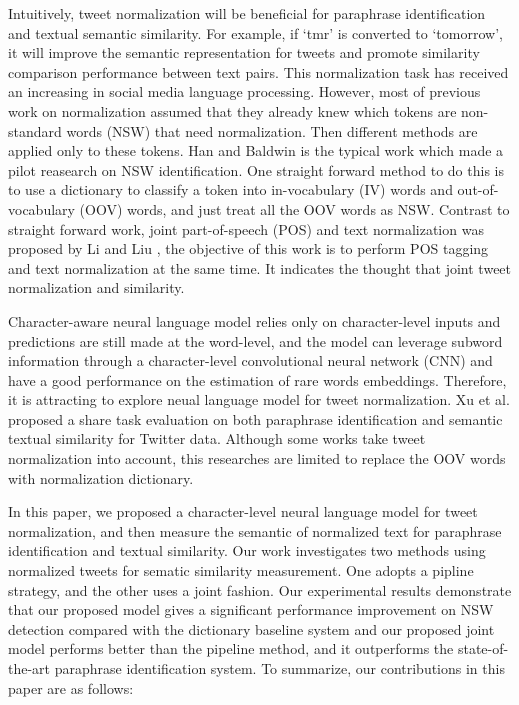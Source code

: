 \documentclass[letterpaper]{article}
\begin{document}
Intuitively, tweet normalization will be beneficial for paraphrase identification and textual  semantic similarity. For example, if `tmr' is converted to `tomorrow', it will improve the semantic representation for tweets and promote similarity comparison performance between text pairs. This normalization task has received an increasing in social media language processing. However, most of previous work on normalization assumed that they already knew which tokens are non-standard words (NSW) that need normalization. Then different methods are applied only to these tokens. Han and Baldwin  is the typical work which made a pilot reasearch on NSW identification. One straight forward method to do this is to use a dictionary to classify a token into in-vocabulary (IV) words and out-of-vocabulary (OOV) words, and just treat all the OOV words as NSW. Contrast to straight forward work, joint part-of-speech (POS) and text normalization was proposed by Li and Liu , the objective of this work is to perform POS tagging and text normalization at the same time. It indicates the thought that joint tweet normalization and similarity.

Character-aware neural language model \cite{Kim-AAAI1612489} relies only on character-level inputs and predictions are still made at the word-level, and the model can leverage subword information through a character-level convolutional neural network (CNN) and have a good performance on the estimation of rare words embeddings. Therefore, it is attracting to explore neual language model for tweet normalization. Xu et al.  proposed a share task evaluation on both  paraphrase identification and semantic textual similarity for Twitter data. Although some works \cite{zarrella-EtAl:2015:SemEval,vandergoot-vannoord:2015:SemEval} take tweet normalization into account, this researches are limited to replace the OOV words with normalization dictionary.

In this paper, we proposed a character-level neural language model for tweet normalization, and then measure the semantic of normalized text for paraphrase identification and textual similarity. Our work investigates two methods using normalized tweets for sematic similarity measurement. One adopts a pipline strategy, and the other uses a joint fashion. Our experimental results demonstrate that our proposed model gives a significant performance improvement on NSW detection compared with the dictionary baseline system and our proposed joint model performs better than the pipeline method, and it outperforms the state-of-the-art paraphrase identification system. To summarize, our contributions in this paper are as follows:
\end{document}
